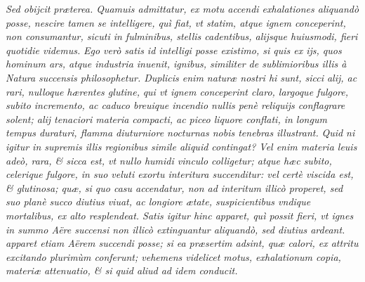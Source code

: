 \documentclass[11pt,twoside,openany]{book}
\begin{document}
\par\bigskip\noindent{}\enspace \textit{Sed obijcit præterea. Quamuis admittatur, ex motu accendi exhalationes aliquandò posse, nescire tamen se intelligere, quì fiat, vt statim, atque ignem conceperint, non consumantur, sicuti in fulminibus, stellis cadentibus, alijsque huiusmodi, fieri quotidie videmus. }\textit{Ego verò satis id intelligi posse existimo, si quis ex ijs, quos hominum ars, atque industria inuenit, ignibus, similiter de sublimioribus illis à Natura succensis philosophetur. Duplicis enim naturæ nostri hi sunt, sicci alij, ac rari, nulloque hærentes glutine, }\textit{qui vt ignem conceperint claro, largoque fulgore, subito incremento, ac caduco breuique incendio nullis penè reliquijs conflagrare solent; alij tenaciori materia compacti, ac piceo liquore conflati, in longum tempus duraturi, flamma diuturniore nocturnas nobis tenebras illustrant. }\textit{Quid ni igitur in supremis illis regionibus simile aliquid contingat? Vel enim materia leuis adeò, rara, \& sicca est, vt nullo humidi vinculo colligetur; atque hæc subito, celerique fulgore, in suo veluti exortu interitura succenditur: vel certè viscida est, \& glutinosa; quæ, si quo casu accendatur, non ad interitum illicò properet, sed suo planè succo diutius viuat, ac longiore ætate, suspicientibus vndique mortalibus, ex alto resplendeat. Satis igitur hinc apparet, quì possit fieri, vt ignes in summo Aëre succensi non illicò extinguantur aliquandò, sed diutius ardeant. apparet etiam Aërem succendi posse; si ea præsertim adsint, quæ calori, ex attritu excitando plurimùm conferunt; vehemens videlicet motus, exhalationum copia, materiæ attenuatio, \& si quid aliud ad idem conducit.}
\end{document}
